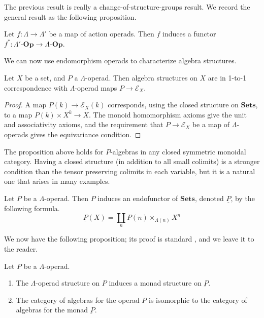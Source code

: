 \documentclass{amsbook} %
\newcommand{\mb}{\mathbf}
\numberwithin{section}{chapter}
\begin{document}
The previous result is really a change-of-structure-groups result.  We record the general result as the following proposition.

\begin{prop}\label{pbaop}
Let $f:\Lambda \rightarrow \Lambda'$ be a map of action operads.  Then $f$ induces a functor $f^{*}:\Lambda'\mbox{-}\mb{Op} \to \Lambda\mbox{-}\mb{Op}$.
\end{prop}

We can now use endomorphism operads to characterize algebra structures.

\begin{prop}\label{endoalg}
Let $X$ be a set, and $P$ a $\Lambda$-operad.  Then algebra structures on $X$ are in 1-to-1 correspondence with $\Lambda$-operad maps $P \rightarrow \mathcal{E}_{X}$.
\end{prop}
\begin{proof}
A map $P(k) \rightarrow \mathcal{E}_{X}(k)$ corresponds, using the closed structure on $\mb{Sets}$, to a map $P(k) \times X^{k} \rightarrow X$.  The monoid homomorphism axioms give the unit and associativity axioms, and the requirement that $P \rightarrow \mathcal{E}_{X}$ be a map of $\Lambda$-operads gives the equivariance condition.
\end{proof}

\begin{rem}
The proposition above holds for $P$-algebras in any closed symmetric monoidal category.  Having a closed structure (in addition to all small colimits) is a stronger condition than the tensor preserving colimits in each variable, but it is a natural one that arises in many examples.
\end{rem}

\begin{Defi}
Let $P$ be a $\Lambda$-operad.  Then $P$ induces an endofunctor of $\mb{Sets}$, denoted $\underline{P}$, by the following formula.
 \[
	\underline{P}(X)	 =  \coprod_n P(n) \times_{\Lambda(n)} X^n
\]
\end{Defi}

We now have the following proposition; its proof is standard \cite{maygeom}, and we leave it to the reader.

\begin{prop}\label{op=monad1}  Let $P$ be a $\Lambda$-operad.
\begin{enumerate}
\item The $\Lambda$-operad structure on $P$ induces a monad structure on $\underbar{P}$.
\item The category of algebras for the operad $P$ is isomorphic to the category of algebras for the monad $\underbar{P}$.
\end{enumerate}
\end{prop}
\end{document}
